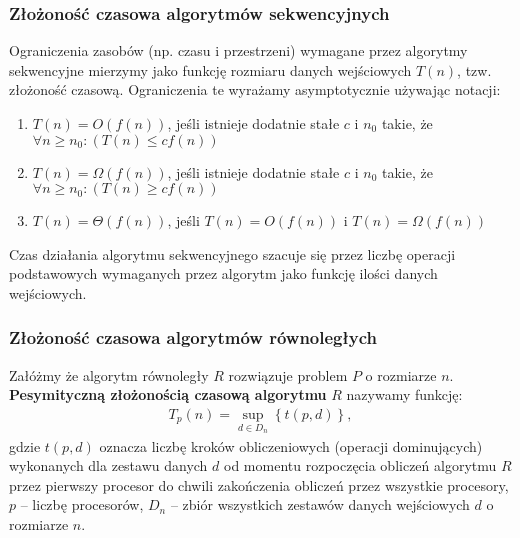 \label{subsec:algorytmy_sekwencyjne}
\subsubsection{Złożoność czasowa algorytmów sekwencyjnych}

Ograniczenia zasobów (np. czasu i przestrzeni) wymagane przez algorytmy sekwencyjne mierzymy jako funkcję rozmiaru danych wejściowych \(T(n)\), tzw. złożoność czasową. Ograniczenia te wyrażamy asymptotycznie używając notacji:

\begin{enumerate}
\item{\(T(n) = O(f(n))\), jeśli istnieje dodatnie stałe \(c\) i \(n_0\) takie, że \(\forall{n \geq n_0}: (T(n)\leq cf(n)) \)}
\item{\(T(n) = \Omega(f(n))\), jeśli istnieje dodatnie stałe \(c\) i \(n_0\) takie, że \(\forall{n \geq n_0}: (T(n)\geq cf(n)) \)}
\item{\(T(n) = \Theta(f(n))\), jeśli \(T(n)=O(f(n))\) i \(T(n)=\Omega(f(n))\)}
\end{enumerate}
Czas działania algorytmu sekwencyjnego szacuje się przez liczbę operacji podstawowych wymaganych przez algorytm jako funkcję ilości danych wejściowych.
\subsubsection{Złożoność czasowa algorytmów równoległych}

\begin{definicja}\label{def:pesymistyczna_zlozonosc_czasowa}
Załóżmy że algorytm równoległy \(R\) rozwiązuje problem \(P\) o rozmiarze \(n\). \textbf{Pesymityczną złożonością czasową algorytmu} \(R\) nazywamy funkcję:\\
\begin{align}
T_{p}(n) = \sup_{d\in{D_n}}{\left\{t(p,d)\right\}},
\end{align}
gdzie \(t(p,d)\) oznacza liczbę kroków obliczeniowych (operacji dominujących) wykonanych dla zestawu danych \(d\) od momentu rozpoczęcia obliczeń algorytmu \(R\) przez pierwszy procesor do chwili zakończenia obliczeń przez wszystkie procesory, \(p\) -- liczbę procesorów, \(D_n\) -- zbiór wszystkich zestawów danych wejściowych \(d\) o rozmiarze \(n\).
\end{definicja}
